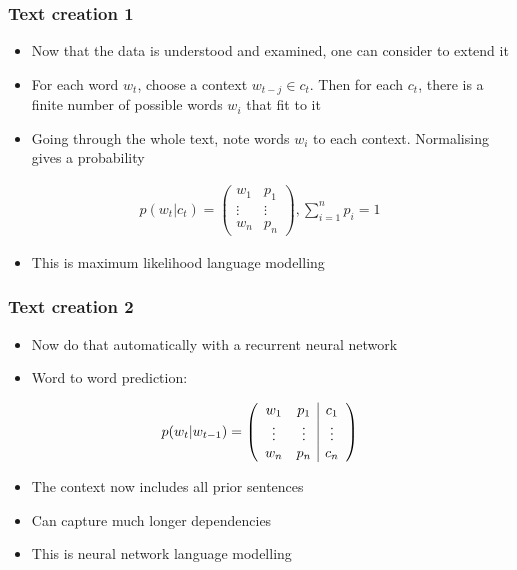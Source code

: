 \documentclass{beamer}
\begin{document}
\begin{frame}
\frametitle{Text creation 1}
\begin{itemize}
\item Now that the data is understood and examined, one can consider to extend it
\item For each word $w_t$, choose a context $w_{t-j} \in c_t$. Then for each $c_t$, there is a finite number of possible words $w_i$ that fit to it
\item Going through the whole text, note words $w_i$ to each context. Normalising gives a probability
\end{itemize}
\begin{align*}
p(w_t|c_t) = \begin{pmatrix} w_1 & p_1 \\\vdots & \vdots \\w_n & p_n\end{pmatrix}, \sum_{i=1}^n p_i = 1
\end{align*}
\begin{itemize}
\item This is maximum likelihood language modelling
\end{itemize}
\end{frame}

\begin{frame}
\frametitle{Text creation 2}
\begin{itemize}
\item Now do that automatically with a recurrent neural network
\item Word to word prediction:
\end{itemize}
\begin{align*}
p(w_t|w_{t-1}) = \left(\begin{array}{c c | c} w_1 &p_1& c_1\\\vdots & \vdots & \vdots \\ w_n & p_n & c_n\end{array}\right)
\end{align*}
\begin{itemize}
\item The context now includes all prior sentences
\item Can capture much longer dependencies
\item This is neural network language modelling
\end{itemize}
\end{frame}
\end{document}
